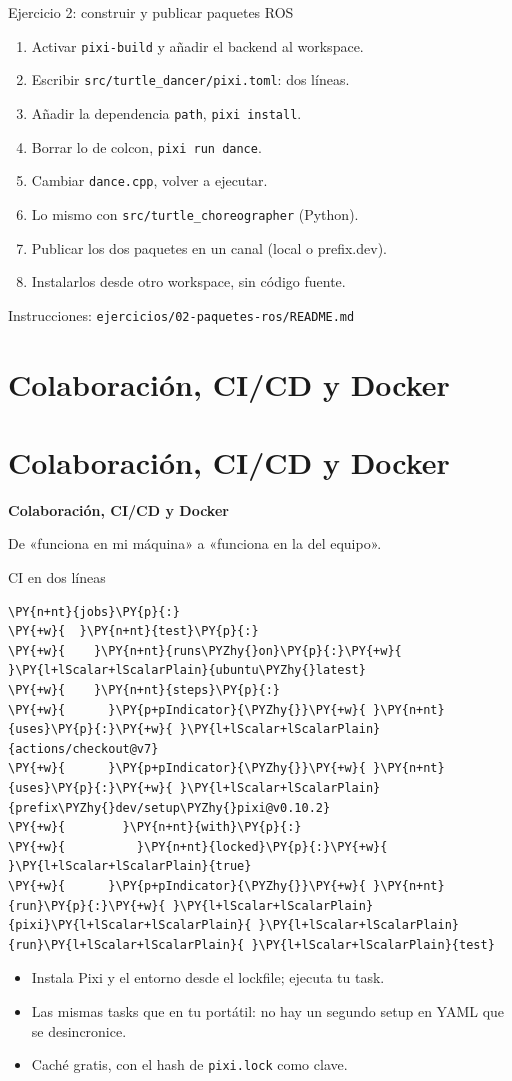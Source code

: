 \documentclass[aspectratio=169]{beamer}
\newcommand{\separador}[2]{%
\begin{frame}
  \centering
  \vfill
  {\usebeamercolor[fg]{structure}\fontsize{34}{40}\selectfont\bfseries #1\par}
  \vspace{1.2em}
  {\Large\color{halfgray} #2\par}
  \vfill
\end{frame}%
}
\newcommand{\seccion}[3][]{%
  \if\relax\detokenize{#1}\relax\section{#2}\else\section[#1]{#2}\fi
  \separador{#2}{#3}%
}
\begin{document}
\begin{frame}{Ejercicio 2: construir y publicar paquetes ROS}
\begin{enumerate}
    \item Activar \texttt{pixi-build} y añadir el backend al workspace.
    \item Escribir \lstinline|src/turtle_dancer/pixi.toml|: dos líneas.
    \item Añadir la dependencia \texttt{path}, \lstinline|pixi install|.
    \item Borrar lo de colcon, \lstinline|pixi run dance|.
    \item Cambiar \texttt{dance.cpp}, volver a ejecutar.
    \item Lo mismo con \lstinline|src/turtle_choreographer| (Python).
    \item Publicar los dos paquetes en un canal (local o prefix.dev).
    \item Instalarlos desde otro workspace, sin código fuente.
\end{enumerate}
\vfill
\small Instrucciones: \texttt{ejercicios/02-paquetes-ros/README.md}
\end{frame}

\seccion[Colaboración]{Colaboración, CI/CD y Docker}{De «funciona en mi máquina» a «funciona en la del equipo».}

\begin{frame}[fragile]{CI en dos líneas}
\begin{filelisting}
\begin{Verbatim}[commandchars=\\\{\},breaklines,breakanywhere]
\PY{n+nt}{jobs}\PY{p}{:}
\PY{+w}{  }\PY{n+nt}{test}\PY{p}{:}
\PY{+w}{    }\PY{n+nt}{runs\PYZhy{}on}\PY{p}{:}\PY{+w}{ }\PY{l+lScalar+lScalarPlain}{ubuntu\PYZhy{}latest}
\PY{+w}{    }\PY{n+nt}{steps}\PY{p}{:}
\PY{+w}{      }\PY{p+pIndicator}{\PYZhy{}}\PY{+w}{ }\PY{n+nt}{uses}\PY{p}{:}\PY{+w}{ }\PY{l+lScalar+lScalarPlain}{actions/checkout@v7}
\PY{+w}{      }\PY{p+pIndicator}{\PYZhy{}}\PY{+w}{ }\PY{n+nt}{uses}\PY{p}{:}\PY{+w}{ }\PY{l+lScalar+lScalarPlain}{prefix\PYZhy{}dev/setup\PYZhy{}pixi@v0.10.2}
\PY{+w}{        }\PY{n+nt}{with}\PY{p}{:}
\PY{+w}{          }\PY{n+nt}{locked}\PY{p}{:}\PY{+w}{ }\PY{l+lScalar+lScalarPlain}{true}
\PY{+w}{      }\PY{p+pIndicator}{\PYZhy{}}\PY{+w}{ }\PY{n+nt}{run}\PY{p}{:}\PY{+w}{ }\PY{l+lScalar+lScalarPlain}{pixi}\PY{l+lScalar+lScalarPlain}{ }\PY{l+lScalar+lScalarPlain}{run}\PY{l+lScalar+lScalarPlain}{ }\PY{l+lScalar+lScalarPlain}{test}
\end{Verbatim}
\end{filelisting}
\begin{itemize}
    \item Instala Pixi y el entorno desde el lockfile; ejecuta tu task.
    \item Las mismas tasks que en tu portátil: no hay un segundo setup en YAML que se desincronice.
    \item Caché gratis, con el hash de \lstinline|pixi.lock| como clave.
\end{itemize}
\end{frame}
\end{document}
